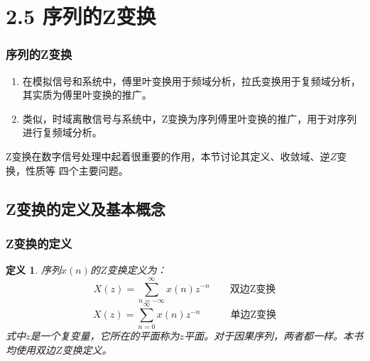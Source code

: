 \documentclass[notheorems,compress,mathserif,table]{beamer}
\newtheorem{definition}{定义}
\begin{document}
\section{2.5 序列的Z变换}
\begin{frame}\frametitle{序列的Z变换}%

\begin{enumerate}
\item 在模拟信号和系统中，傅里叶变换用于频域分析，拉氏变换用于复频域分析，其实质为傅里叶变换的推广。
\item 类似，时域离散信号与系统中，Z变换为序列傅里叶变换的推广，用于对序列进行复频域分析。
\end{enumerate}



Z变换在数字信号处理中起着很重要的作用，本节讨论其定义、收敛域、逆$Z$变换，性质等
四个主要问题。

\end{frame}


\subsection*{Z变换的定义及基本概念}

\begin{frame}\frametitle{Z变换的定义}%
\begin{definition}
序列$x(n)$的$Z$变换定义为：
\begin{equation*} %
X(z) = \sum_{n=-\infty}^{\infty}x(n)z^{-n} \quad\quad\mbox{双边Z变换}
\end{equation*}
\begin{equation*} %
X(z) = \sum_{n=0}^{\infty}x(n)z^{-n}    \quad\quad\quad\mbox{单边Z变换}
\end{equation*}
式中$z$是一个复变量，它所在的平面称为$z$平面。对于因果序列，两者都一样。本书均使用双边$Z$变换定义。
\end{definition}
\end{frame}
\end{document}
